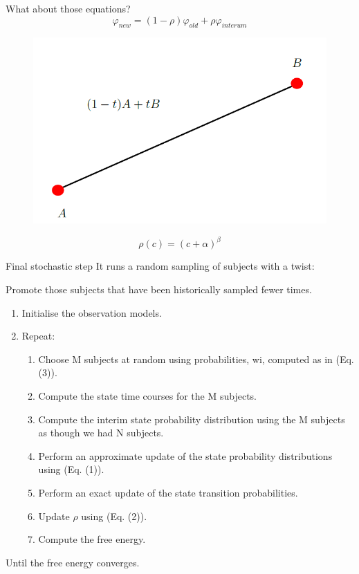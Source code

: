 \documentclass{beamer}
\begin{document}
\begin{frame}{What about those equations?}
	\begin{equation}
		\varphi_{new}= (1-\rho)\varphi_{old}+ \rho \varphi_{interum}
	\end{equation}
	\begin{figure}[h]
		\centering
			\includegraphics[scale=0.4]{../Figures/fig_simple_line.png}
	\end{figure}
	\begin{equation}
		\rho(c)= (c+\alpha)^\beta
	\end{equation}
	
\end{frame}


\begin{frame}{Final stochastic step}
	It runs a random sampling of subjects with a twist:
	
	Promote those subjects that have been historically sampled fewer times. 
\begin{enumerate}	
	\item Initialise the observation models.
	
	\item Repeat:
	\begin{enumerate}
	\item Choose M subjects at random using probabilities, wi, computed as in (Eq. (3)).
	\item Compute the state time courses for the M subjects.
	\item Compute the interim state probability distribution using the M subjects as though we had N subjects.
	\item 
	Perform an approximate update of the state probability distributions using (Eq. (1)).
	\item 
	Perform an exact update of the state transition probabilities.
	\item 
	Update $\rho$ using (Eq. (2)).
	\item 
	Compute the free energy.
	\end{enumerate}

\end{enumerate}
	
	
	Until the free energy converges.
\end{frame}
\end{document}
